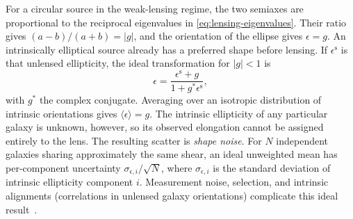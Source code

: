 For a circular source in the weak-lensing regime, the two semiaxes are proportional to the reciprocal eigenvalues in \cref{eq:lensing-eigenvalues}. Their ratio gives $(a-b)/(a+b)=|g|$, and the orientation of the ellipse gives $\epsilon=g$. An intrinsically elliptical source already has a preferred shape before lensing. If $\epsilon^{\mathrm{s}}$ is that unlensed ellipticity, the ideal transformation for $|g|<1$ is
\begin{equation}
    \epsilon=\frac{\epsilon^{\mathrm{s}}+g}{1+g^*\epsilon^{\mathrm{s}}},
    \label{eq:ellipticity-transform}
\end{equation}
with $g^*$ the complex conjugate. Averaging over an isotropic distribution of intrinsic orientations gives $\langle\epsilon\rangle=g$. The intrinsic ellipticity of any particular galaxy is unknown, however, so its observed elongation cannot be assigned entirely to the lens. The resulting scatter is \emph{shape noise}. For $N$ independent galaxies sharing approximately the same shear, an ideal unweighted mean has per-component uncertainty $\sigma_{\epsilon,i}/\sqrt{N}$, where $\sigma_{\epsilon,i}$ is the standard deviation of intrinsic ellipticity component $i$. Measurement noise, selection, and intrinsic alignments (correlations in unlensed galaxy orientations) complicate this ideal result~\cite{schneider_weak_2006,mandelbaum_weak_2018}.
